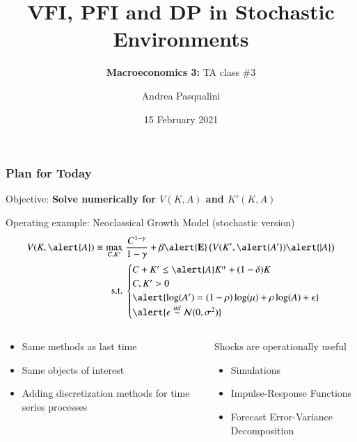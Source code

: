 \documentclass[10pt, aspectratio=1610, handout]{beamer}
\title[VFI, PFI and DP]{
  \textbf{VFI, PFI and DP in Stochastic Environments}
}
\subtitle[Macro 3: TA\#3]{
  \textbf{Macroeconomics 3:} TA class \#3
}
\author[A.~Pasqualini]{
  Andrea Pasqualini
}
\institute[Bocconi]{Bocconi University}
\date{
  15 February 2021
}
\newcommand{\E}{\mathbf{E}}
\begin{document}
  \begin{frame}
    \maketitle
  \end{frame}

  \begin{frame}
    \frametitle{Plan for Today}

    Objective: \textbf{Solve numerically for $V(K, A)$ and $K'(K, A)$}

    \vfill\pause

    Operating example: Neoclassical Growth Model (stochastic version)
    \begin{align*}
      V(K, \alert{A}) \equiv \max_{C, K'} &\; \frac{C^{1 - \gamma}}{1 - \gamma} + \beta \alert{\E} \left( V(K', \alert{A'}) \alert{| A} \right) \\
      \text{s.t.} &\;
      \begin{cases}
        C + K' \leq \alert{A} K^\alpha + (1 - \delta) K \\
        C, K' > 0 \\
        \alert{\log(A') = (1-\rho) \log(\mu) + \rho \log(A) + \epsilon} \\
        \alert{\epsilon \overset{iid}{\sim} \mathcal{N}(0, \sigma^2)}
      \end{cases}
    \end{align*}

    \vfill\pause

    \begin{columns}[T]
      \begin{column}{0.45\textwidth}
        \begin{itemize}
          \item Same methods as last time
          \item Same objects of interest
          \item Adding discretization methods for time series processes
        \end{itemize}
      \end{column}
      \begin{column}{0.45\textwidth}
        Shocks are operationally useful
        \begin{itemize}
          \item Simulations
          \item Impulse-Response Functions
          \item Forecast Error-Variance Decomposition
        \end{itemize}
      \end{column}
    \end{columns}

  \end{frame}
\end{document}

